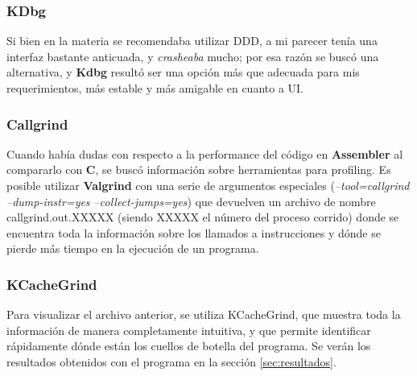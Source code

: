 \subsubsection*{KDbg}
Si bien en la materia se recomendaba utilizar DDD, a mi parecer tenía una interfaz bastante anticuada, y \textit{crasheaba} mucho; por esa razón se buscó una alternativa, y \textbf{Kdbg} resultó ser una opción más que adecuada para mis requerimientos, más estable y más amigable en cuanto a UI.

\subsubsection*{Callgrind}
Cuando había dudas con respecto a la performance del código en \textbf{Assembler} al compararlo con \textbf{C}, se buscó información sobre herramientas para profiling. Es posible utilizar \textbf{Valgrind} con una serie de argumentos especiales (\textit{--tool=callgrind --dump-instr=yes --collect-jumps=yes}) que devuelven un archivo de nombre callgrind.out.XXXXX (siendo XXXXX el número del proceso corrido) donde se encuentra toda la información sobre los llamados a instrucciones y dónde se pierde más tiempo en la ejecución de un programa.

\subsubsection*{KCacheGrind}
Para visualizar el archivo anterior, se utiliza KCacheGrind, que muestra toda la información de manera completamente intuitiva, y que permite identificar rápidamente dónde están los cuellos de botella del programa. Se verán los resultados obtenidos con el programa en la sección \ref{sec:resultados}.
